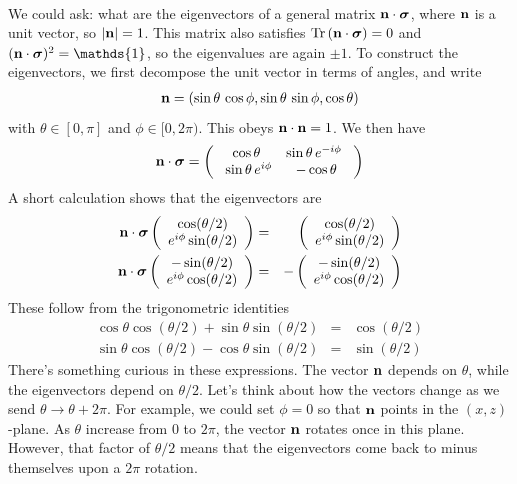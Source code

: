\documentclass[12pt]{article}
\def\be{\begin{eqnarray}}
\def\ee{\end{eqnarray}}
\newcommand{\nn}{\nonumber}
\newcommand\para{\paragraph{}}
\newcommand\bsigma{\mbox{\boldmath $\sigma$}}
\newcommand{\ra}{\rightarrow}
\begin{document}
{{\para
We could ask: what are the eigenvectors of a general matrix \mbox{${\bf n}\cdot \bsigma$}, where ${\bf n}$ is a unit vector, so $|{\bf n}|=1$. This matrix also satisfies \mbox{${\rm Tr}\,({\bf n}\cdot\bsigma)=0$} and $({\bf n}\cdot\bsigma)^2 = \mathds{1}$, so the eigenvalues are again $\pm 1$. To construct the eigenvectors, we first decompose the unit vector in terms of angles, and write
%
\be {\bf n} = (\sin\theta\,\cos\phi,\sin\theta\,\sin\phi ,\cos\theta)\nn\ee
%
with $\theta\in [0,\pi]$ and $\phi\in [0,2\pi)$.  This  obeys ${\bf n}\cdot{\bf n}=1$. We then have
%
\be {\bf n}\cdot\bsigma = \left(\begin{array}{cc} \cos\theta & \sin\theta\, e^{-i\phi}\ \\ \ \sin\theta\,e^{i\phi} & -\cos\theta\end{array}\right)\nn\ee
%
A short calculation shows that the eigenvectors are
%
\be {\bf n}\cdot\bsigma  \left(\begin{array}{c} \cos(\theta/2) \\  e^{i\phi} \sin(\theta/2)\end{array}\right)   &=&
 \left(\begin{array}{c} \cos(\theta/2) \\  e^{i\phi} \sin(\theta/2)\end{array}\right) \nn \\ 
{\bf n}\cdot\bsigma \left(\begin{array}{c}  -\sin(\theta/2) \\    e^{i\phi}\cos(\theta/2)\end{array}\right) &=& 
- \left(\begin{array}{c} -\sin(\theta/2) \\   e^{i\phi}  \cos(\theta/2)\end{array}\right)   \nn\ee
%
These follow from the trigonometric identities
%
\be \cos\theta\cos(\theta/2) +\sin\theta\sin(\theta/2) &=& \cos(\theta/2)\nn\\
\sin\theta\cos(\theta/2) -\cos\theta\sin(\theta/2) &=& \sin(\theta/2) \nn\ee
%
There's something curious in these expressions. The vector ${\bf n}$ depends on $\theta$, while the eigenvectors depend on  $\theta/2$. Let's think about how the vectors change as we send $\theta \ra \theta + 2\pi$. For example, we could set $\phi=0$ so that ${\bf n}$ points in the $(x,z)$-plane. As $\theta$ increase from 0 to $2\pi$, the vector ${\bf n}$ rotates once in this plane. However, that factor of $\theta/2$ means that the eigenvectors come back to minus themselves upon a $2\pi$ rotation. 
}






}
\end{document}
